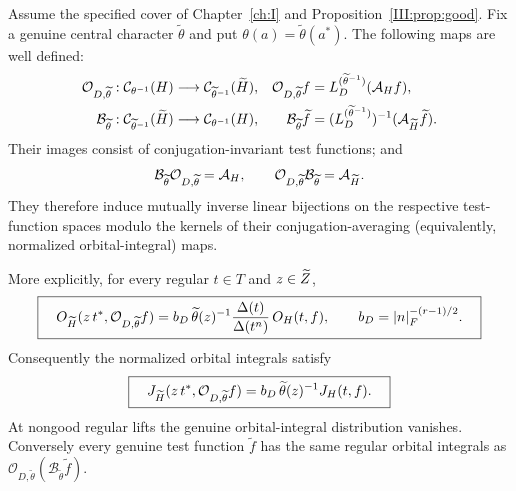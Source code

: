 \begin{theorem}\label{III:thm:test-transfer}
Assume the specified cover of Chapter~\ref{ch:I} and Proposition~\ref{III:prop:good}.
Fix a genuine central character $\widetilde\theta$ and put
$\theta(a)=\widetilde\theta(a^*)$. The following maps are well defined:
\begin{align}
\mathcal O_{D,\widetilde\theta}:\mathcal C_{\theta^{-1}}(H)
&\longrightarrow\mathcal C_{\widetilde\theta^{-1}}(\widetilde H),
& \mathcal O_{D,\widetilde\theta}f
&=L_D^{(\widetilde\theta^{-1})}(\mathcal A_Hf),
\label{III:eq:test-transfer-definition}\\
\mathcal B_{\widetilde\theta}:\mathcal C_{\widetilde\theta^{-1}}(\widetilde H)
&\longrightarrow\mathcal C_{\theta^{-1}}(H),
& \mathcal B_{\widetilde\theta}\widetilde f
&=(L_D^{(\widetilde\theta^{-1})})^{-1}
  (\mathcal A_{\widetilde H}\widetilde f).
\label{III:eq:back-transfer-definition}
\end{align}
Their images consist of conjugation-invariant test functions; and
\[
\mathcal B_{\widetilde\theta}\mathcal O_{D,\widetilde\theta}
=\mathcal A_H,\qquad
\mathcal O_{D,\widetilde\theta}\mathcal B_{\widetilde\theta}
=\mathcal A_{\widetilde H}.
\]
They therefore induce mutually inverse linear bijections on the
respective test-function spaces modulo the kernels of their
conjugation-averaging (equivalently, normalized orbital-integral) maps.

More explicitly, for every regular $t\in T$ and $z\in\widetilde Z$,
\begin{equation}\label{III:eq:OI-transfer}
\boxed{\quad
O_{\widetilde H}(z\,t^*,\mathcal O_{D,\widetilde\theta}f)
=b_D\,\widetilde\theta(z)^{-1}
\frac{\Delta(t)}{\Delta(t^n)}\,O_H(t,f),
\qquad b_D=|n|_F^{-(r-1)/2}.
\quad}
\end{equation}
Consequently the normalized orbital integrals satisfy
\begin{equation}\label{III:eq:JO-transfer}
\boxed{\quad
J_{\widetilde H}(z\,t^*,\mathcal O_{D,\widetilde\theta}f)
=b_D\,\widetilde\theta(z)^{-1}J_H(t,f).
\quad}
\end{equation}
At nongood regular lifts the genuine orbital-integral distribution
vanishes. Conversely every genuine test function $\widetilde f$ has the
same regular orbital integrals as
$\mathcal O_{D,\widetilde\theta}(\mathcal B_{\widetilde\theta}\widetilde f)$.
\end{theorem}
